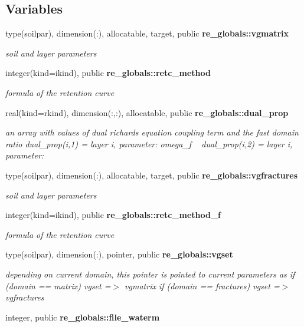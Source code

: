 \subsection*{Variables}
\begin{DoxyCompactItemize}
\item 
type(soilpar), dimension(\+:), allocatable, target, public {\bf re\+\_\+globals\+::vgmatrix}
\begin{DoxyCompactList}\small\item\em soil and layer parameters \end{DoxyCompactList}\item 
integer(kind=ikind), public {\bf re\+\_\+globals\+::retc\+\_\+method}
\begin{DoxyCompactList}\small\item\em formula of the retention curve \end{DoxyCompactList}\item 
real(kind=rkind), dimension(\+:,\+:), allocatable, public {\bf re\+\_\+globals\+::dual\+\_\+prop}
\begin{DoxyCompactList}\small\item\em an array with values of dual richards equation coupling term and the fast domain ratio dual\+\_\+prop(i,1) = layer i, parameter\+: omega\+\_\+f ~\newline
 dual\+\_\+prop(i,2) = layer i, parameter\+: \end{DoxyCompactList}\item 
type(soilpar), dimension(\+:), allocatable, target, public {\bf re\+\_\+globals\+::vgfractures}
\begin{DoxyCompactList}\small\item\em soil and layer parameters \end{DoxyCompactList}\item 
integer(kind=ikind), public {\bf re\+\_\+globals\+::retc\+\_\+method\+\_\+f}
\begin{DoxyCompactList}\small\item\em formula of the retention curve \end{DoxyCompactList}\item 
type(soilpar), dimension(\+:), pointer, public {\bf re\+\_\+globals\+::vgset}
\begin{DoxyCompactList}\small\item\em depending on current domain, this pointer is pointed to current parameters as if (domain == matrix) vgset =$>$ vgmatrix if (domain == fractures) vgset =$>$ vgfractures \end{DoxyCompactList}\item 
integer, public {\bf re\+\_\+globals\+::file\+\_\+waterm}
\end{DoxyCompactItemize}

